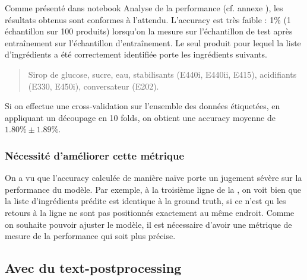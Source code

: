                 Comme présenté dans notebook \og Analyse de la performance \fg (cf. annexe ), les résultats obtenus sont conformes à l'attendu.
                L'accuracy est très faible : 1\% (1 échantillon sur 100 produits) lorsqu'on la mesure sur l'échantillon de test après entraînement sur l'échantillon d'entraînement.
                Le seul produit pour lequel la liste d'ingrédients a été correctement identifiée porte les ingrédients suivants.
                \begin{quotation}
                    Sirop de glucose, sucre, eau, stabilisants (E440i, E440ii, E415), acidifiants (E330, E450i), conversateur (E202).
                \end{quotation}
                Si on effectue une cross-validation sur l'ensemble des données étiquetées, en appliquant un découpage en 10 folds, on obtient une accuracy moyenne de $1.80\% \pm 1.89\%$.

                \subsubsection{Nécessité d'améliorer cette métrique}
                On a vu que l'accuracy calculée de manière naïve porte un jugement sévère sur la performance du modèle.
                Par exemple, à la troisième ligne de la , on voit bien que la liste d'ingrédients prédite est identique à la ground truth, si ce n'est qu les retours à la ligne ne sont pas positionnés exactement au même endroit.
                Comme on souhaite pouvoir ajuster le modèle, il est nécessaire d'avoir une métrique de mesure de la performance qui soit plus précise.

            \subsection{Avec du \og text-postprocessing \fg}
            \label{text_postprocessing}

